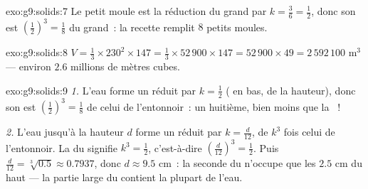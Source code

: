 \begin{solution}{exo:g9:solids:7}
Le petit moule est la réduction du grand par $k = \frac36 =
\frac12$, donc son  est $\left(\frac12\right)^3 = \frac18$ du
grand~: la recette remplit $8$ petits moules.
\end{solution}

\begin{solution}{exo:g9:solids:8}
$V = \frac13 \times 230^2 \times 147 = \frac13 \times 52\,900 \times 147
= 52\,900 \times 49 = 2\,592\,100$ m$^3$ --- environ $2.6$ millions de
mètres cubes.
\end{solution}

\begin{solution}{exo:g9:solids:9}
\emph{1.} L'eau forme un  réduit par $k = \frac12$ ( en bas,
 de la hauteur), donc son  est $\left(\frac12\right)^3 =
\frac18$ de celui de l'entonnoir~: un huitième, bien moins que la
~!

\emph{2.} L'eau jusqu'à la hauteur $d$ forme un  réduit par
$k = \frac{d}{12}$, de  $k^3$ fois celui de l'entonnoir. La 
du  signifie $k^3 = \frac12$, c'est-à-dire
$\left(\frac{d}{12}\right)^3 = \frac12$. Puis
$\frac{d}{12} = \sqrt[3]{0.5} \approx 0.7937$, donc
$d \approx 9.5$ cm~: la seconde  du  n'occupe que les $2.5$
cm du haut --- la partie large du  contient la plupart de l'eau.
\end{solution}

